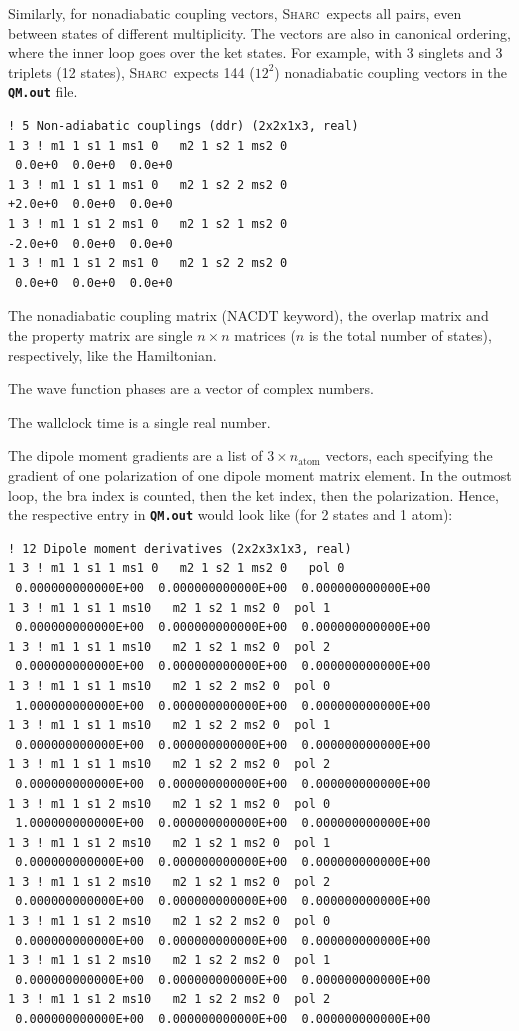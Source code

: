 \documentclass[a4paper,10pt,DIV=15,openany]{scrbook}
\newcommand{\sharc}{\textsc{Sharc}}
\newcommand{\ttt}[1]{\textbf{\texttt{#1}}}
\newenvironment{example}{
  \setlength{\OuterFrameSep}{3pt}
  \vspace{0mm}
  \definecolor{shadecolor}{HTML}{E4F4FF}
  \begin{shaded}
}{
  \end{shaded}
}
\begin{document}
Similarly, for nonadiabatic coupling vectors, \sharc\ expects all pairs, even between states of different multiplicity. The vectors are also in canonical ordering, where the inner loop goes over the ket states. For example, with 3 singlets and 3 triplets (12 states), \sharc\ expects 144 ($12^2$) nonadiabatic coupling vectors in the \ttt{QM.out} file.
\begin{example}
  \begin{verbatim}
! 5 Non-adiabatic couplings (ddr) (2x2x1x3, real)
1 3 ! m1 1 s1 1 ms1 0   m2 1 s2 1 ms2 0
 0.0e+0  0.0e+0  0.0e+0 
1 3 ! m1 1 s1 1 ms1 0   m2 1 s2 2 ms2 0
+2.0e+0  0.0e+0  0.0e+0 
1 3 ! m1 1 s1 2 ms1 0   m2 1 s2 1 ms2 0
-2.0e+0  0.0e+0  0.0e+0 
1 3 ! m1 1 s1 2 ms1 0   m2 1 s2 2 ms2 0
 0.0e+0  0.0e+0  0.0e+0 
\end{verbatim}
\end{example}

The nonadiabatic coupling matrix (NACDT keyword), the overlap matrix and the property matrix are single $n\times n$ matrices ($n$ is the total number of states), respectively, like the Hamiltonian. 

The wave function phases are a vector of complex numbers.

The wallclock time is a single real number. 

The dipole moment gradients are a list of $3\times n_\text{atom}$ vectors, each specifying the gradient of one polarization of one dipole moment matrix element. In the outmost loop, the bra index is counted, then the ket index, then the polarization. Hence, the respective entry in \ttt{QM.out} would look like (for 2 states and 1 atom):
\begin{example}
  \begin{verbatim}
! 12 Dipole moment derivatives (2x2x3x1x3, real)
1 3 ! m1 1 s1 1 ms1 0   m2 1 s2 1 ms2 0   pol 0
 0.000000000000E+00  0.000000000000E+00  0.000000000000E+00 
1 3 ! m1 1 s1 1 ms10   m2 1 s2 1 ms2 0  pol 1
 0.000000000000E+00  0.000000000000E+00  0.000000000000E+00 
1 3 ! m1 1 s1 1 ms10   m2 1 s2 1 ms2 0  pol 2
 0.000000000000E+00  0.000000000000E+00  0.000000000000E+00 
1 3 ! m1 1 s1 1 ms10   m2 1 s2 2 ms2 0  pol 0
 1.000000000000E+00  0.000000000000E+00  0.000000000000E+00 
1 3 ! m1 1 s1 1 ms10   m2 1 s2 2 ms2 0  pol 1
 0.000000000000E+00  0.000000000000E+00  0.000000000000E+00 
1 3 ! m1 1 s1 1 ms10   m2 1 s2 2 ms2 0  pol 2
 0.000000000000E+00  0.000000000000E+00  0.000000000000E+00 
1 3 ! m1 1 s1 2 ms10   m2 1 s2 1 ms2 0  pol 0
 1.000000000000E+00  0.000000000000E+00  0.000000000000E+00 
1 3 ! m1 1 s1 2 ms10   m2 1 s2 1 ms2 0  pol 1
 0.000000000000E+00  0.000000000000E+00  0.000000000000E+00 
1 3 ! m1 1 s1 2 ms10   m2 1 s2 1 ms2 0  pol 2
 0.000000000000E+00  0.000000000000E+00  0.000000000000E+00 
1 3 ! m1 1 s1 2 ms10   m2 1 s2 2 ms2 0  pol 0
 0.000000000000E+00  0.000000000000E+00  0.000000000000E+00 
1 3 ! m1 1 s1 2 ms10   m2 1 s2 2 ms2 0  pol 1
 0.000000000000E+00  0.000000000000E+00  0.000000000000E+00 
1 3 ! m1 1 s1 2 ms10   m2 1 s2 2 ms2 0  pol 2
 0.000000000000E+00  0.000000000000E+00  0.000000000000E+00 
\end{verbatim}
\end{example}
\end{document}
